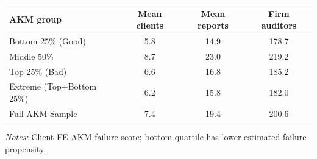 \documentclass[10pt]{article}
\begin{document}
\begin{minipage}{19cm}\fontsize{10}{12}\selectfont\setlength{\tabcolsep}{4pt}\renewcommand{\arraystretch}{1.12}


\centering
{}
\begin{threeparttable}
\begin{tabular}{p{}ccc}
\toprule
AKM group & Mean clients & Mean reports & Firm auditors \\
\midrule
Bottom 25\% (Good) & 5.8 & 14.9 & 178.7 \\
Middle 50\% & 8.7 & 23.0 & 219.2 \\
Top 25\% (Bad) & 6.6 & 16.8 & 185.2 \\
Extreme (Top+Bottom 25\%) & 6.2 & 15.8 & 182.0 \\
Full AKM Sample & 7.4 & 19.4 & 200.6 \\
\bottomrule
\end{tabular}
\begin{tablenotes}\fontsize{9}{11}\selectfont
\item \raggedright \fontsize{9}{11}\selectfont \textit{Notes:} Client-FE AKM failure score; bottom quartile has lower estimated failure propensity.
\end{tablenotes}
\end{threeparttable}

\end{minipage}
\end{document}
